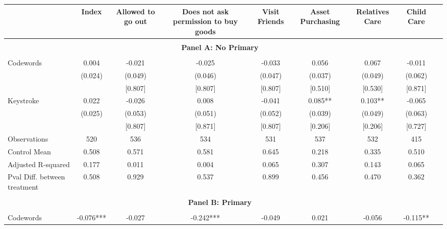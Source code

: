\begin{tabular}{l*{8}{c}} \hline\hline
                    &\multicolumn{1}{c}{Index}&\multicolumn{1}{c}{Allowed to go out}&\multicolumn{1}{c}{Does not ask permission to buy goods}&\multicolumn{1}{c}{Visit Friends}&\multicolumn{1}{c}{Asset Purchasing}&\multicolumn{1}{c}{Relatives Care}&\multicolumn{1}{c}{Child Care}\\
\hline \\ \multicolumn{8}{c}{\textbf{Panel A: No Primary}} \\\\[-1ex]
Codewords           &       0.004   &      -0.021   &      -0.025   &      -0.033   &       0.056   &       0.067   &      -0.011   \\
                    &     (0.024)   &     (0.049)   &     (0.046)   &     (0.047)   &     (0.037)   &     (0.049)   &     (0.062)   \\
                    &               &     [0.807]   &     [0.807]   &     [0.807]   &     [0.510]   &     [0.530]   &     [0.871]   \\
Keystroke           &       0.022   &      -0.026   &       0.008   &      -0.041   &       0.085** &       0.103** &      -0.065   \\
                    &     (0.025)   &     (0.053)   &     (0.051)   &     (0.052)   &     (0.039)   &     (0.049)   &     (0.063)   \\
                    &               &     [0.807]   &     [0.871]   &     [0.807]   &     [0.206]   &     [0.206]   &     [0.727]   \\
\hline
Observations        &         520   &         536   &         534   &         531   &         537   &         532   &         415   \\
Control Mean        &       0.508   &       0.571   &       0.581   &       0.645   &       0.218   &       0.335   &       0.510   \\
Adjusted R-squared  &       0.177   &       0.011   &       0.004   &       0.065   &       0.307   &       0.143   &       0.065   \\
Pval Diff. between treatment&       0.508   &       0.929   &       0.537   &       0.899   &       0.456   &       0.470   &       0.362   \\
\hline \\ \multicolumn{8}{c}{\textbf{Panel B: Primary}} \\\\[-1ex]
Codewords           &      -0.076***&      -0.027   &      -0.242***&      -0.049   &       0.021   &      -0.056   &      -0.115** \\

\end{tabular}
